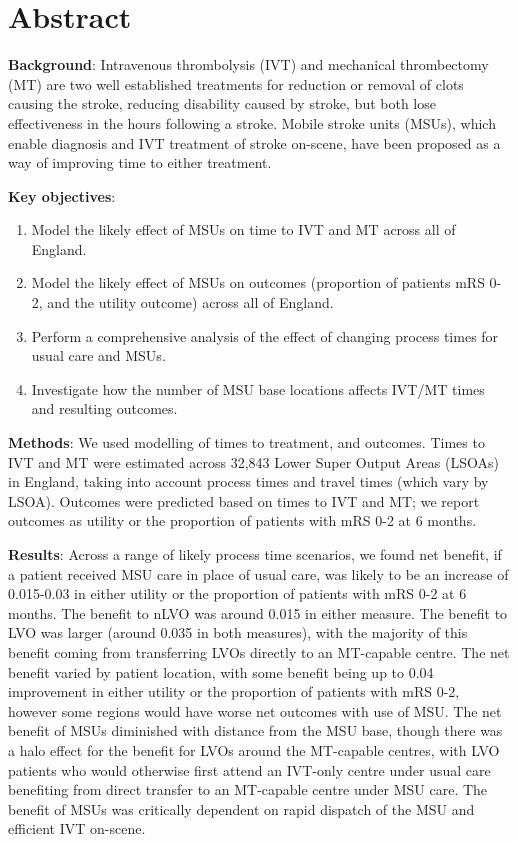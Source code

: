 \section*{Abstract}

\textbf{Background}: Intravenous thrombolysis (IVT) and mechanical thrombectomy (MT) are two well established treatments for reduction or removal of clots causing the stroke, reducing disability caused by stroke, but both lose effectiveness in the hours following a stroke. Mobile stroke units (MSUs), which enable diagnosis and IVT treatment of stroke on-scene, have been proposed as a way of improving time to either treatment.

\textbf{Key objectives}:

\begin{enumerate}
    \item Model the likely effect of MSUs on time to IVT and MT across all of England.
    \item Model the likely effect of MSUs on outcomes (proportion of patients mRS 0-2, and the utility outcome) across all of England.
    \item Perform a comprehensive analysis of the effect of changing process times for usual care and MSUs.
    \item Investigate how the number of MSU base locations affects IVT/MT times and resulting outcomes.
\end{enumerate}

\textbf{Methods}: We used modelling of times to treatment, and outcomes. Times to IVT and MT were estimated across 32,843 Lower Super Output Areas (LSOAs) in England, taking into account process times and travel times (which vary by LSOA). Outcomes were predicted based on times to IVT and MT; we report outcomes as utility or the proportion of patients with mRS 0-2 at 6 months.

\textbf{Results}: Across a range of likely process time scenarios, we found net benefit, if a patient received MSU care in place of usual care, was likely to be an increase of 0.015-0.03 in either utility or the proportion of patients with mRS 0-2 at 6 months. The benefit to nLVO was around 0.015 in either measure. The benefit to LVO was larger (around 0.035 in both measures), with the majority of this benefit coming from transferring LVOs directly to an MT-capable centre. The net benefit varied by patient location, with some benefit being up to 0.04 improvement in either utility or the proportion of patients with mRS 0-2, however some regions would have worse net outcomes with use of MSU. The net benefit of MSUs diminished with distance from the MSU base, though there was a halo effect for the benefit for LVOs around the MT-capable centres, with LVO patients who would otherwise first attend an IVT-only centre under usual care benefiting from direct transfer to an MT-capable centre under MSU care. The benefit of MSUs was critically dependent on rapid dispatch of the MSU and efficient IVT on-scene.

